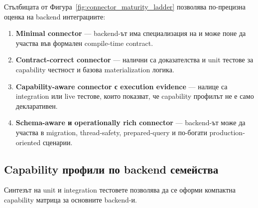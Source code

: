 Стълбицата от Фигура~\ref{fig:connector_maturity_ladder} позволява по-прецизна оценка на backend интеграциите:

\begin{enumerate}[label=\arabic*.]
    \item \textbf{Minimal connector} --- backend-ът има специализация на  и може поне да участва във формален compile-time contract.
    \item \textbf{Contract-correct connector} --- налични са  доказателства и unit тестове за capability честност и базова materialization логика.
    \item \textbf{Capability-aware connector с execution evidence} --- налице са integration или live тестове, които показват, че capability профилът не е само декларативен.
    \item \textbf{Schema-aware и operationally rich connector} --- backend-ът може да участва в migration, thread-safety, prepared-query и по-богати production-oriented сценарии.
\end{enumerate}

\subsection{Capability профили по backend семейства}

Синтезът на unit и integration тестовете позволява да се оформи компактна capability матрица за основните backend-и.

